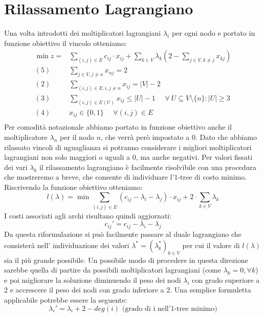 \documentclass[
	article,			%
	12pt,				%
	oneside,			%
	a4paper,			%
	english,			%
	italian,				%
	sumario=tradicional,
	]{abntex2}
\begin{document}
\section{Rilassamento Lagrangiano}
Una volta introdotti dei moltiplicatori lagrangiani $\lambda_i$ per ogni nodo e portato in funzione obiettivo il vincolo otteniamo:
\begin{equation*}
    \begin{split}
         \min z = & \sum_{(i,j) \in E} c_{ij} \cdot x_{ij} + \sum_{k\in V} \lambda_k (2 - \sum_{j\in V, k\neq j} x_{kj})\\
        (5)\:\:\:\:\:\: & \sum_{j \in V, j \neq n} x_{nj} = 2 \\
        (2) \:\:\:\:\:\: & \sum_{(i,j)\in E, i, j \neq n} x_{ij} = |V|-2 \\
        (3) \:\:\:\:\:\: & \sum_{(i,j) \in E(U)} x_{ij} \leq |U| - 1 \:\:\:\:\:\: \forall\: U \subseteq V\setminus\{n\} : |U| \geq 3 \\
        (4) \:\:\:\:\:\: & x_{ij} \in \{0,1\} \:\:\:\:\:\: \forall (i,j) \in E\\
    \end{split}
\end{equation*}
Per comodità notazionale abbiamo portato in funzione obiettivo anche il moltiplicatore $\lambda_n$ per il nodo $n$, che verrà però impostato a 0. Dato che abbiamo rilassato vincoli di uguaglianza si potranno considerare i migliori moltiplicatori lagrangiani non solo maggiori o uguali a 0, ma anche negativi. Per valori fissati dei vari $\lambda_k$ il rilassamento lagrangiano è facilmente risolvibile con una procedura che mostreremo a breve, che consente di individuare l'1-tree di costo minimo.
\newline
Riscrivendo la funzione obiettivo otteniamo:
\begin{equation*}
    l(\lambda) = \min \sum_{(i,j)\in E} ( c_{ij} - \lambda_i - \lambda_j) \cdot x_{ij} + 2 \cdot \sum_{k \in V} \lambda_k
\end{equation*}
I costi associati agli archi risultano quindi aggiornati:
\begin{equation*}
    c_{ij}' = c_{ij} - \lambda_i - \lambda_j
\end{equation*}
Da questa riformulazione si può facilmente passare al duale lagrangiano che consisterà nell' individuazione dei valori $\lambda^* = (\lambda_k^*)_{k\in V}$ per cui il valore di $l(\lambda)$ sia il più grande possibile. Un possibile modo di procedere in questa direzione sarebbe quella di partire da possibili moltiplicatori lagrangiani (come $\lambda_k = 0, \forall k$) e poi migliorare la soluzione diminuendo il peso dei nodi $\lambda_i$ con grado superiore a 2 e accrescere il peso dei nodi con grado inferiore a 2. Una semplice formuletta applicabile potrebbe essere la seguente:
\begin{equation*}
    \lambda_i' = \lambda_i + 2 - deg(i) \text{ (grado di i nell'1-tree minimo)}
\end{equation*}
\end{document}
